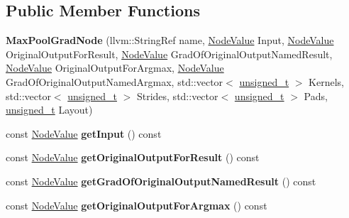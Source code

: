 \subsection*{Public Member Functions}
\begin{DoxyCompactItemize}
\item 
\mbox{\label{classglow_1_1_max_pool_grad_node_a0c08fbb0bdbc4b80abfc93e8aa24ea2e}} 
{\bfseries Max\+Pool\+Grad\+Node} (llvm\+::\+String\+Ref name, \hyperlink{structglow_1_1_node_value}{Node\+Value} Input, \hyperlink{structglow_1_1_node_value}{Node\+Value} Original\+Output\+For\+Result, \hyperlink{structglow_1_1_node_value}{Node\+Value} Grad\+Of\+Original\+Output\+Named\+Result, \hyperlink{structglow_1_1_node_value}{Node\+Value} Original\+Output\+For\+Argmax, \hyperlink{structglow_1_1_node_value}{Node\+Value} Grad\+Of\+Original\+Output\+Named\+Argmax, std\+::vector$<$ \hyperlink{namespaceglow_a0ca574644e1e42ef193a9947fb4d8911}{unsigned\+\_\+t} $>$ Kernels, std\+::vector$<$ \hyperlink{namespaceglow_a0ca574644e1e42ef193a9947fb4d8911}{unsigned\+\_\+t} $>$ Strides, std\+::vector$<$ \hyperlink{namespaceglow_a0ca574644e1e42ef193a9947fb4d8911}{unsigned\+\_\+t} $>$ Pads, \hyperlink{namespaceglow_a0ca574644e1e42ef193a9947fb4d8911}{unsigned\+\_\+t} Layout)
\item 
\mbox{\label{classglow_1_1_max_pool_grad_node_ab45714f8bba75aa4ad05f56ccc644f79}} 
const \hyperlink{structglow_1_1_node_value}{Node\+Value} {\bfseries get\+Input} () const
\item 
\mbox{\label{classglow_1_1_max_pool_grad_node_a3696352b247c3db034b59eabd40402ff}} 
const \hyperlink{structglow_1_1_node_value}{Node\+Value} {\bfseries get\+Original\+Output\+For\+Result} () const
\item 
\mbox{\label{classglow_1_1_max_pool_grad_node_a8f164bfbde6fcd861789a7b5214d4036}} 
const \hyperlink{structglow_1_1_node_value}{Node\+Value} {\bfseries get\+Grad\+Of\+Original\+Output\+Named\+Result} () const
\item 
\mbox{\label{classglow_1_1_max_pool_grad_node_a9627238339e621a1dbfe22b44b78cbe8}} 
const \hyperlink{structglow_1_1_node_value}{Node\+Value} {\bfseries get\+Original\+Output\+For\+Argmax} () const

\end{DoxyCompactItemize}

